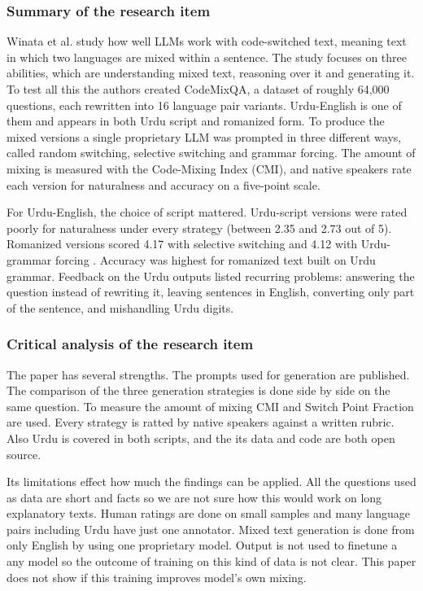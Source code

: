 \documentclass{FastFyp}
\begin{document}
\subsubsection{Summary of the research item}
Winata et al. \cite{winata2026codeswitched} study how well LLMs work with code-switched text, meaning text in which two languages are mixed within a sentence. The study focuses on three abilities, which are understanding mixed text, reasoning over it and generating it. To test all this the authors created CodeMixQA, a dataset of roughly 64,000 questions, each rewritten into 16 language pair variants. Urdu-English is one of them and appears in both Urdu script and romanized form. To produce the mixed versions a single proprietary LLM was prompted in three different ways, called random switching, selective switching and grammar forcing. The amount of mixing is measured with the Code-Mixing Index (CMI), and native speakers rate each version for naturalness and accuracy on a five-point scale.

For Urdu-English, the choice of script mattered. Urdu-script versions were rated poorly for naturalness under every strategy (between 2.35 and 2.73 out of 5). Romanized versions scored 4.17 with selective switching and 4.12 with Urdu-grammar forcing . Accuracy was highest for romanized text built on Urdu grammar. Feedback on the Urdu outputs listed recurring problems: answering the question instead of rewriting it, leaving sentences in English, converting only part of the sentence, and mishandling Urdu digits.

\subsubsection{Critical analysis of the research item}
The paper has several strengths. The prompts used for generation are published. The comparison of the three generation strategies is done side by side on the same question. To measure the amount of mixing CMI and Switch Point Fraction are used. Every strategy is ratted by native speakers against a written rubric. Also Urdu is covered in both scripts, and the its data and code are both open source.

Its limitations effect how much the findings can be applied. All the questions used as data are short and facts so we are not sure how this would work on long explanatory texts. Human ratings are done on small samples and many language pairs including Urdu have just one annotator. Mixed text generation is done from only English by using one proprietary model. Output is not used to finetune a any model so the outcome of training on this kind of data is not clear. This paper does not show if this training improves model's own mixing.
\end{document}
